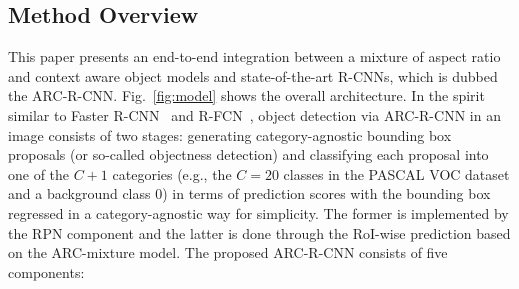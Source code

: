 \documentclass[10pt,twocolumn,letterpaper]{article}
\begin{document}
\vspace{-1mm}
\subsection{Method Overview} 
\vspace{-1mm}
This paper presents an end-to-end integration between a mixture of aspect ratio and context aware object models and state-of-the-art R-CNNs, which is dubbed the ARC-R-CNN.
Fig.~\ref{fig:model} shows the overall architecture. 
In the spirit similar to Faster R-CNN~\cite{faster_rcnn} and R-FCN~\cite{rfcn}, object detection via ARC-R-CNN in an image consists of two stages: generating category-agnostic bounding box proposals (or so-called objectness detection) and classifying each proposal into one of the $C+1$ categories (e.g., the $C=20$ classes in the PASCAL VOC dataset and a background class $0$) in terms of prediction scores with the bounding box regressed in a category-agnostic way for simplicity. The former is implemented by the RPN component and the latter is done through the RoI-wise prediction based on the ARC-mixture model.
The proposed ARC-R-CNN consists of five components: 
\end{document}
